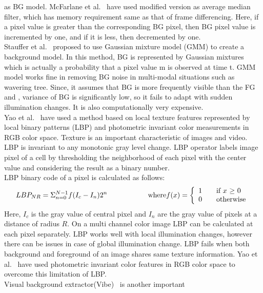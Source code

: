as BG model.  McFarlane et al.~\cite{14} have used modified version as
average median filter, which has memory requirement same as that of
frame differencing.  Here, if a pixel value is greater than the
corresponding BG pixel, then BG pixel value is incremented by one, and
if it is less, then decremented by one.\\
\indent  Stauffer et al.~\cite{15} proposed to use Gaussian mixture
model (GMM) to create a background model. In this method, BG is
represented by Gaussian mixtures which is actually a probability that a
pixel value m is observed at time t. GMM model works fine in removing BG
noise in multi-modal situations such as wavering tree. Since, it assumes
that BG is more frequently visible than the FG and , variance of BG is
significantly low, so it fails to adapt with sudden illumination
changes. It is also computationally very expensive.\\ 
\indent Yao et al.~\cite{11} have used a method based on local texture
features represented by local binary patterns (LBP) and photometric
invariant color measurements in RGB color space. Texture is an important
characteristic of images and video. LBP is invariant to any monotonic
gray level change.  LBP operator labels image pixel of a cell by
thresholding the neighborhood of each pixel with the center value and
considering the result as a binary number.\\
\indent LBP binary code of a pixel is calculated as follows:
\begin{equation}
LBP_{NR} = \Sigma _{n = 0} ^{N - 1} f(I_c - I_n) 2^n \hspace{20 mm} \mathrm{where} f(x) = \left\{ 
  \begin{array}{l l}
     1 & \quad \text{if $x$ $\geq$  $0$}\\
     0 & \quad \text{otherwise}
   \end{array} \right.
\end{equation}
\indent Here, $I_c$ is the gray value of central pixel and $I_n$ are the gray
value of pixels at a distance of radius $R$.  On a multi channel color
image LBP can be calculated at each pixel separately. LBP works well with
local illumination changes, however there can be issues in case of
global illumination change. LBP fails when both background and foreground
of an image shares same texture information. Yao et al.~\cite{11} have used
photometric invariant color features in RGB color space to overcome this
limitation of LBP.\\
\indent Visual background extractor(Vibe)~\cite{9} is another important
